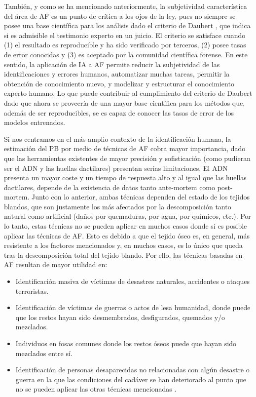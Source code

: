 También, y como se ha mencionado anteriormente, la subjetividad característica del área de AF es un punto de crítica a los ojos de la ley, pues no siempre se posee una base científica para los análisis dado el criterio de Daubert \cite{noauthor_daubert_nodate}, que indica si es admisible el testimonio experto en un juicio. El criterio se satisface cuando (1) el resultado es reproducible y ha sido verificado por terceros, (2) posee tasas de error conocidas y (3) es aceptado por la comunidad científica forense. En este sentido, la aplicación de IA a AF permite reducir la subjetividad de las identificaciones y errores humanos, automatizar muchas tareas, permitir la obtención de conocimiento nuevo, y modelizar y estructurar el conocimiento experto humano. Lo que puede contribuir al cumplimiento del criterio de Daubert dado que ahora se proveería de una mayor base científica para los métodos que, además de ser reproducibles, se es capaz de conocer las tasas de error de los modelos entrenados.  

Si nos centramos en el más amplio contexto de la identificación humana, la estimación del PB por medio de técnicas de AF cobra mayor importancia, dado que las herramientas existentes de mayor precisión y sofisticación (como pudieran ser el ADN y las huellas dactilares) presentan serias limitaciones. El ADN presenta un mayor coste y un tiempo de respuesta alto y al igual que las huellas dactilares, depende de la existencia de datos tanto ante-mortem como post-mortem. Junto con lo anterior, ambas técnicas dependen del estado de los tejidos blandos, que son justamente los más afectados por la descomposición tanto natural como artificial (daños por quemaduras, por agua, por químicos, etc.). Por lo tanto, estas técnicas no se pueden aplicar en muchos casos donde sí es posible aplicar las técnicas de AF. Esto es debido a que el tejido óseo es, en general, más resistente a los factores mencionados y, en muchos casos, es lo único que queda tras la descomposición total del tejido blando. Por ello, las técnicas basadas en AF resultan de mayor utilidad en:
\begin{itemize}
    \item Identificación masiva de víctimas de desastres naturales, accidentes o ataques terroristas.
    \item Identificación de víctimas de guerras o actos de lesa humanidad, donde puede que los restos hayan sido desmembrados, desfigurados, quemados y/o mezclados.
    \item Individuos en fosas comunes donde los restos óseos puede que hayan sido mezclados entre sí.
    \item Identificación de personas desaparecidas no relacionadas con algún desastre o guerra en la que las condiciones del cadáver se han deteriorado al punto que no se pueden aplicar las otras técnicas mencionadas \cite{byers_introduction_2016}.
\end{itemize}

